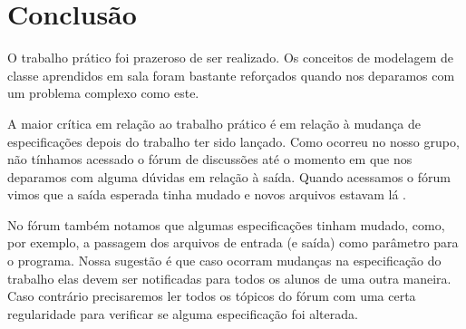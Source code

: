 \documentclass[12pt]{article}
\begin{document}
\section{Conclusão}
\label{conclusao}

O trabalho prático foi prazeroso de ser realizado. Os conceitos de modelagem de classe aprendidos em sala foram bastante reforçados quando nos deparamos com um problema complexo como este.

A maior crítica em relação ao trabalho prático é em relação à mudança de especificações depois do trabalho ter sido lançado. Como ocorreu no nosso grupo, não tínhamos acessado o fórum de discussões até o momento em que nos deparamos com alguma dúvidas em relação à saída. Quando acessamos o fórum vimos que a saída esperada tinha mudado e novos arquivos estavam lá \cite{forum}. 

No fórum também notamos que algumas especificações tinham mudado, como, por exemplo, a passagem dos arquivos de entrada (e saída) como parâmetro para o programa. Nossa sugestão é que caso ocorram mudanças na especificação do trabalho elas devem ser notificadas para todos os alunos de uma outra maneira. Caso contrário precisaremos ler todos os tópicos do fórum com uma certa regularidade para verificar se alguma especificação foi alterada.




\end{document}

